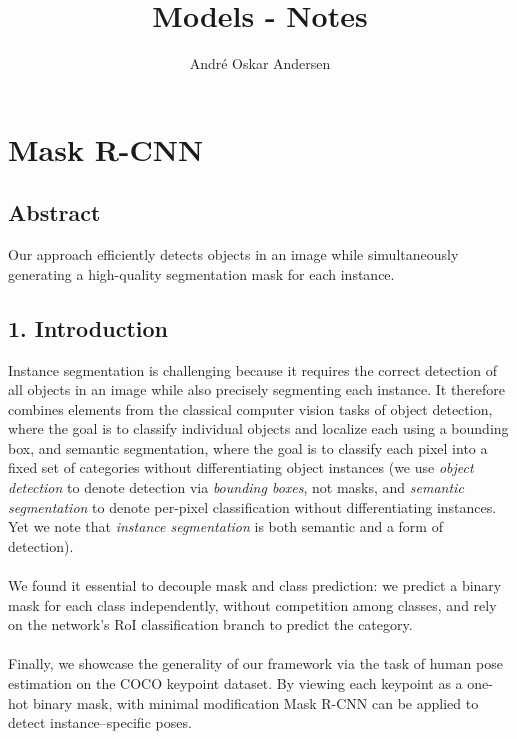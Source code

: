\documentclass[a4paper]{report}
\title{Models - Notes}
\author{André Oskar Andersen}
\date{}
\begin{document}
    
\maketitle

\chapter*{Mask R-CNN}
\section*{Abstract}
Our approach efficiently detects objects in an image while simultaneously generating a high-quality segmentation mask for each instance. 

\section*{1. Introduction}
Instance segmentation is challenging because it requires the correct detection of all objects in an image while also precisely segmenting each instance. It therefore combines elements from the classical computer vision tasks of object detection, where the goal is to classify individual objects and localize each using a bounding box, and semantic segmentation, where the goal is to classify each pixel into a fixed set of categories without differentiating object instances (we use \textit{object detection} to denote detection via \textit{bounding boxes}, not masks, and \textit{semantic segmentation} to denote per-pixel classification without differentiating instances. Yet we note that \textit{instance segmentation} is both semantic and a form of detection).
\\
\\
We found it essential to decouple mask and class prediction: we predict a binary mask for each class independently, without competition among classes, and rely on the network's RoI classification branch to predict the category.
\\
\\
Finally, we showcase the generality of our framework via the task of human pose estimation on the COCO keypoint dataset. By viewing each keypoint as a one-hot binary mask, with minimal modification Mask R-CNN can be applied to detect instance--specific poses.
\end{document}

